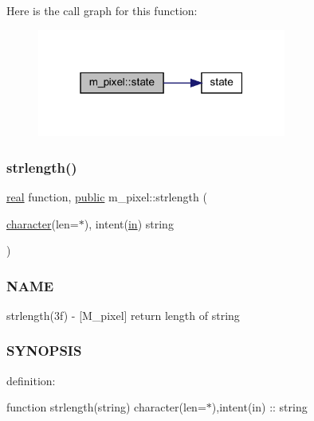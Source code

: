 Here is the call graph for this function\+:
\nopagebreak
\begin{figure}[H]
\begin{center}
\leavevmode
\includegraphics[width=232pt]{namespacem__pixel_aa24c465b23b0ddda341e97bc206fe249_cgraph}
\end{center}
\end{figure}
\mbox{\label{namespacem__pixel_a0468f8d9308bade7f8f2a68a133271d2}} 
\subsubsection{\texorpdfstring{strlength()}{strlength()}}
{\footnotesize\ttfamily \hyperlink{read__watch_83_8txt_abdb62bde002f38ef75f810d3a905a823}{real} function, \hyperlink{M__stopwatch_83_8txt_a2f74811300c361e53b430611a7d1769f}{public} m\+\_\+pixel\+::strlength (\begin{DoxyParamCaption}\item[{\hyperlink{option__stopwatch_83_8txt_abd4b21fbbd175834027b5224bfe97e66}{character}(len=$\ast$), intent(\hyperlink{M__journal_83_8txt_afce72651d1eed785a2132bee863b2f38}{in})}]{string }\end{DoxyParamCaption})}



\subsubsection*{N\+A\+ME}

strlength(3f) -\/ \mbox{[}M\+\_\+pixel\mbox{]} return length of string 

\subsubsection*{S\+Y\+N\+O\+P\+S\+IS}

definition\+:

function strlength(string) character(len=$\ast$),intent(in) \+:\+: string

